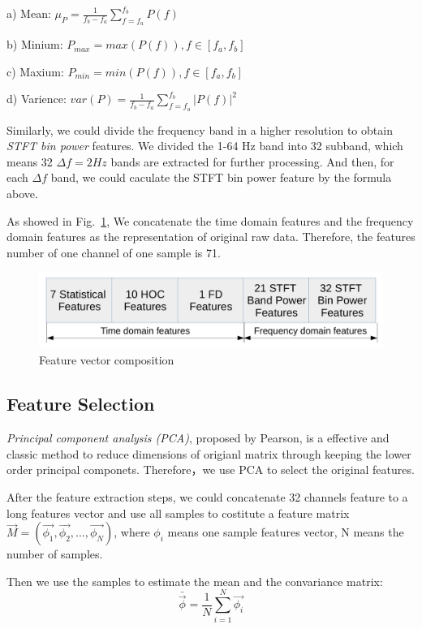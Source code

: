 \documentclass[runningheads,a4paper]{llncs}
\begin{document}
a) Mean: $\mu_P = \frac{1}{f_b-f_a}\sum_{f=f_a}^{f_b}P(f)$

b) Minium: $P_{max} = max(P(f)), f\in[f_a,f_b]$

c) Maxium: $P_{min} = min(P(f)), f\in[f_a,f_b]$

d) Varience: $ var(P) = \frac{1}{f_b-f_a}\sum_{f=f_a}^{f_b}|P(f)|^2$

Similarly, we could divide the frequency band in a higher resolution to obtain
\emph{STFT bin power} features. We divided the 1-64 Hz band into 32 subband, which
means 32 $\Delta f = 2Hz$ bands are extracted for further processing.
And then, for each $\Delta f$ band, we could caculate the STFT bin power
feature by the formula above.

As showed in Fig.~\ref{longfeature},
We concatenate the time domain features and the frequency domain features as
the representation of original raw data. Therefore, the features number of one channel of
one sample is 71.

\begin{figure}
  \centering
  \includegraphics[height=2.5cm]{images/15}
  \caption{Feature vector composition}
  \label{longfeature}
\end{figure}

\subsection{Feature Selection}
\emph{Principal component analysis (PCA)}, proposed by Pearson\cite{PCA},
is a effective and classic method to reduce dimensions of origianl
matrix through keeping the lower order principal componets. Therefore，we use PCA to
select the original features.

After the feature extraction steps, we could concatenate 32 channels feature to
a long features vector and use all samples to costitute a feature matrix
$\vec{M} = (\vec{\phi_1}, \vec{\phi_2},..., \vec{\phi_N})$, where $\phi_i$ means
one sample features vector, N means the number of samples.

Then we use the samples to estimate the mean and the convariance matrix:
\begin{equation}
    \bar{\vec{\phi} }= \frac{1}{N}\sum_{i=1}^{N}\vec{\phi_i}
\end{equation}
\end{document}
